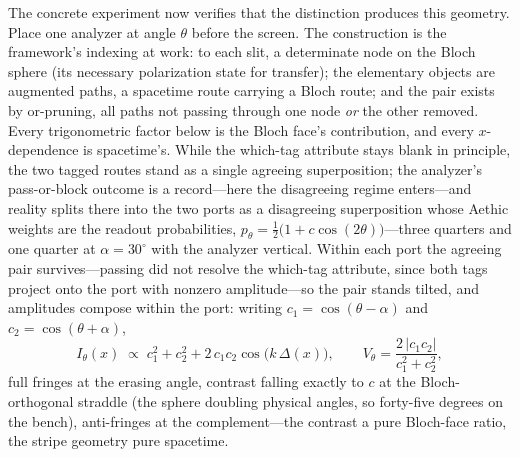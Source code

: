 \documentclass[11pt]{article}
\theoremstyle{definition}
\begin{document}
The concrete experiment now verifies that the distinction produces this geometry. Place one analyzer at angle $\theta$ before the screen. The construction is the framework's indexing at work: to each slit, a determinate node on the Bloch sphere (its necessary polarization state for transfer); the elementary objects are augmented paths, a spacetime route carrying a Bloch route; and the pair exists by or-pruning, all paths not passing through one node \emph{or} the other removed. Every trigonometric factor below is the Bloch face's contribution, and every $x$-dependence is spacetime's. While the which-tag attribute stays blank in principle, the two tagged routes stand as a single agreeing superposition; the analyzer's pass-or-block outcome is a record---here the disagreeing regime enters---and reality splits there into the two ports as a disagreeing superposition whose Aethic weights are the readout probabilities, $p_\theta = \tfrac{1}{2}\big(1 + c \cos(2\theta)\big)$---three quarters and one quarter at $\alpha = 30^\circ$ with the analyzer vertical. Within each port the agreeing pair survives---passing did not resolve the which-tag attribute, since both tags project onto the port with nonzero amplitude---so the pair stands tilted, and amplitudes compose within the port: writing $c_1 = \cos(\theta - \alpha)$ and $c_2 = \cos(\theta + \alpha)$,
\[ I_\theta(x) \;\propto\; c_1^2 + c_2^2 + 2\, c_1 c_2 \cos\!\big(k\,\Delta(x)\big), \qquad V_\theta = \frac{2\,|c_1 c_2|}{c_1^2 + c_2^2}, \]
full fringes at the erasing angle, contrast falling exactly to $c$ at the Bloch-orthogonal straddle (the sphere doubling physical angles, so forty-five degrees on the bench), anti-fringes at the complement---the contrast a pure Bloch-face ratio, the stripe geometry pure spacetime.
\end{document}
